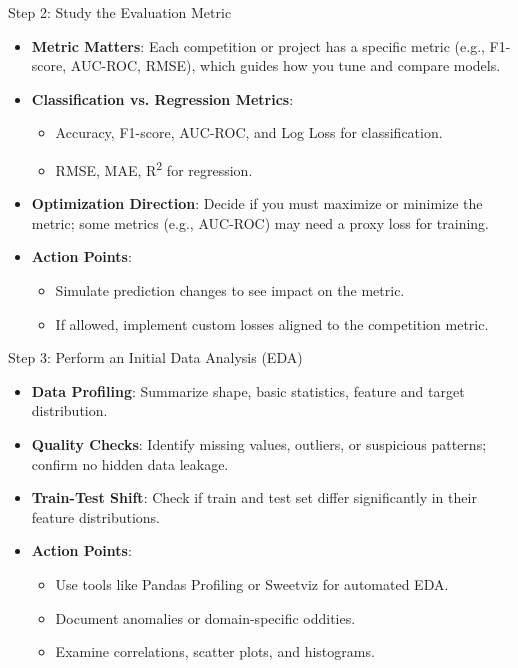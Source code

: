 \documentclass[10pt,compress,t,notes=noshow, xcolor=table]{beamer}
\begin{document}
\begin{frame}{Step 2: Study the Evaluation Metric}
\begin{itemize}
  \item \textbf{Metric Matters}: Each competition or project has a specific metric (e.g., F1-score, AUC-ROC, RMSE), which guides how you tune and compare models.
  \item \textbf{Classification vs. Regression Metrics}:
    \begin{itemize}
      \item Accuracy, F1-score, AUC-ROC, and Log Loss for classification.
      \item RMSE, MAE, R\textsuperscript{2} for regression.
    \end{itemize}
  \item \textbf{Optimization Direction}: Decide if you must maximize or minimize the metric; some metrics (e.g., AUC-ROC) may need a proxy loss for training.
  \item \textbf{Action Points}:
    \begin{itemize}
      \item Simulate prediction changes to see impact on the metric.
      \item If allowed, implement custom losses aligned to the competition metric.
    \end{itemize}
\end{itemize}
\end{frame}

\begin{frame}{Step 3: Perform an Initial Data Analysis (EDA)}
\begin{itemize}
  \item \textbf{Data Profiling}: Summarize shape, basic statistics, feature and target distribution.
  \item \textbf{Quality Checks}: Identify missing values, outliers, or suspicious patterns; confirm no hidden data leakage.
  \item \textbf{Train-Test Shift}: Check if train and test set differ significantly in their feature distributions.
  \item \textbf{Action Points}:
    \begin{itemize}
      \item Use tools like Pandas Profiling or Sweetviz for automated EDA.
      \item Document anomalies or domain-specific oddities.
      \item Examine correlations, scatter plots, and histograms.
    \end{itemize}
\end{itemize}
\end{frame}
\end{document}
